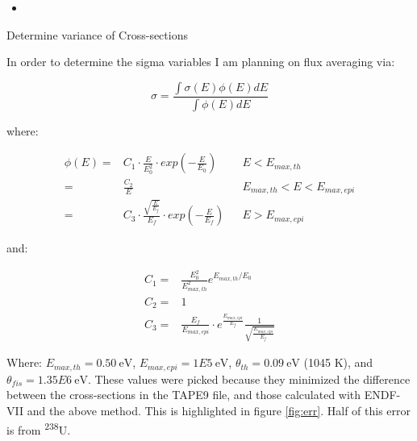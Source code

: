 \documentclass[11pt,notitlepage]{article}
\newcommand{\tss}{\textsuperscript}
\newcommand{\pythonscript}[2]{
\begin{itemize}
\item[]
\end{itemize}
}
\begin{document}
\begin{todolist}
  \pythonscript{../ChangeTAPE/change}{Script for modifying ORIGEN2 input.}


\item{Determine variance of Cross-sections}

  In order to determine the sigma %
  variables I am planning on
  flux averaging via:

  \begin{equation*}
    \sigma=\frac{\int\sigma(E)\phi(E)dE}{\int\phi(E)dE}
  \end{equation*}

  

  where:

  \begin{align*}
    \phi(E) =& C_1\cdot \frac{E}{E_0^2} \cdot
    exp\left(-\frac{E}{E_0}\right) &&E<E_{max,th}\\
    =& \frac{C_2}{E}  &&E_{max,th}<E<E_{max,epi}\\
    =& C_3 \cdot \frac{\sqrt{\frac{E}{E_f}}}{E_f}
    \cdot exp\left(-\frac{E}{E_{f}}
    \right) &&E>E_{max,epi}
  \end{align*}

  and:

  \begin{align*}
    C_1=&\frac{E_0^2}{E^2_{max,th}}e^{E_{max,th}/E_0}
      \\
      C_2=&1\\
      C_3=&\frac{E_f}{E_{max,epi}}
      \cdot
      e^{\frac{E_{max,epi}}{E_f}}\frac{1}
      {\sqrt{\frac{E_{max,epi}}{E_f}}}
  \end{align*}

  Where: $E_{max,th}=0.50\ \text{eV}$,
  $E_{max,epi}=1E5\ \text{eV}$,
  $\theta_{th}=0.09\ \text{eV}$ (1045 K),
  and $\theta_{fis}=1.35E6\ \text{eV}$. These values
  were picked because they minimized the difference
  between the cross-sections in the TAPE9 file, and
  those calculated with ENDF-VII and the above method.
  This is highlighted in figure \ref{fig:err}. Half
  of this error is from \tss{238}U.


\end{todolist}
\end{document}
